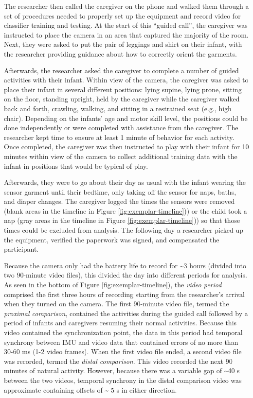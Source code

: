 \documentclass[
  man]{apa6}
\begin{document}
The researcher then called the caregiver on the phone and walked them through a set of procedures needed to properly set up the equipment and record video for classifier training and testing. At the start of this ``guided call'', the caregiver was instructed to place the camera in an area that captured the majority of the room. Next, they were asked to put the pair of leggings and shirt on their infant, with the researcher providing guidance about how to correctly orient the garments.

Afterwards, the researcher asked the caregiver to complete a number of guided activities with their infant. Within view of the camera, the caregiver was asked to place their infant in several different positions: lying supine, lying prone, sitting on the floor, standing upright, held by the caregiver while the caregiver walked back and forth, crawling, walking, and sitting in a restrained seat (e.g., high chair). Depending on the infants' age and motor skill level, the positions could be done independently or were completed with assistance from the caregiver. The researcher kept time to ensure at least 1 minute of behavior for each activity. Once completed, the caregiver was then instructed to play with their infant for 10 minutes within view of the camera to collect additional training data with the infant in positions that would be typical of play.

Afterwards, they were to go about their day as usual with the infant wearing the sensor garment until their bedtime, only taking off the sensor for naps, baths, and diaper changes. The caregiver logged the times the sensors were removed (blank areas in the timeline in Figure \ref{fig:exemplar-timeline})) or the child took a nap (gray areas in the timeline in Figure \ref{fig:exemplar-timeline})) so that those times could be excluded from analysis. The following day a researcher picked up the equipment, verified the paperwork was signed, and compensated the participant.

Because the camera only had the battery life to record for \textasciitilde3 hours (divided into two 90-minute video files), this divided the day into different periods for analysis. As seen in the bottom of Figure \ref{fig:exemplar-timeline}), the \emph{video period} comprised the first three hours of recording starting from the researcher's arrival when they turned on the camera. The first 90-minute video file, termed the \emph{proximal comparison}, contained the activities during the guided call followed by a period of infants and caregivers resuming their normal activities. Because this video contained the synchronization point, the data in this period had temporal synchrony between IMU and video data that contained errors of no more than 30-60 ms (1-2 video frames). When the first video file ended, a second video file was recorded, termed the \emph{distal comparison}. This video recorded the next 90 minutes of natural activity. However, because there was a variable gap of \textasciitilde40 s between the two videos, temporal synchrony in the distal comparison video was approximate containing offsets of \textasciitilde{} 5 s in either direction.
\end{document}
